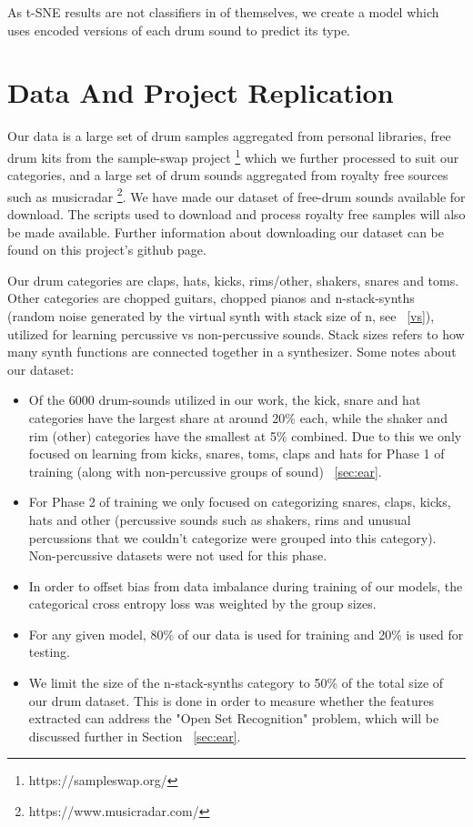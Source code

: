 \documentclass[\main/thesis.tex]{subfiles}
\begin{document}
As t-SNE results are not classifiers in of themselves, we create a model which uses encoded versions of each drum sound to predict its type.

\section{Data And Project Replication}
\label{data}

Our data is a large set of drum samples aggregated from personal libraries, free drum kits from the sample-swap project \footnote{https://sampleswap.org/} which we further processed to suit our categories, and a large set of drum sounds aggregated from royalty free sources such as musicradar \footnote{https://www.musicradar.com/}. We have made our dataset of free-drum sounds available for download. The scripts used to download and process royalty free samples will also be made available. Further information about downloading our dataset can be found on this project's github page. 

Our drum categories are claps, hats, kicks, rims/other, shakers, snares and toms. Other categories are chopped guitars, chopped pianos and n-stack-synths (random noise generated by the virtual synth with stack size of n, see ~\ref{vs}), utilized for learning percussive vs non-percussive sounds. Stack sizes refers to how many synth functions are connected together in a synthesizer.
Some notes about our dataset:


\begin{itemize}
\item Of the 6000 drum-sounds utilized in our work, the kick, snare and hat categories have the largest share at around 20\% each, while the shaker and rim (other) categories have the smallest at 5\% combined. Due to this we only focused on learning from kicks, snares, toms, claps and hats for Phase 1 of training (along with non-percussive groups of sound) ~\ref{sec:ear}.

\item For Phase 2 of training we only focused on categorizing snares, claps, kicks, hats and other (percussive sounds such as shakers, rims and unusual percussions that we couldn't categorize were grouped into this category). Non-percussive datasets were not used for this phase. 
\item In order to offset bias from data imbalance during training of our models, the categorical cross entropy loss was weighted by the group sizes. 
\item For any given model, 80\% of our data is used for training and 20\% is used for testing. 

\item We limit the size of the n-stack-synths category to 50\% of the total size of our drum dataset. This is done in order to measure whether the features extracted can address the "Open Set Recognition" problem, which will be discussed further in Section ~\ref{sec:ear}.
\end{itemize}
\end{document}
